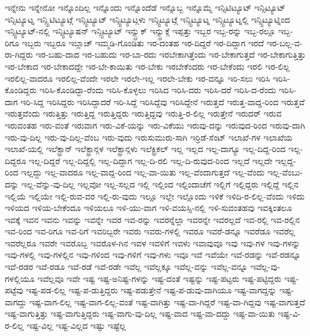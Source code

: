 {ಇನ್ನೇನು
ಇನ್ನೇನೋ
ಇನ್ನೊಂದಿಲ್ಲ
ಇನ್ನೊಂದು
ಇನ್ನೊಂದೆಡೆ
ಇನ್ನೊಬ್ಬ
ಇನ್ನೊಮ್ಮೆ
ಇನ್ಸಿಟಿಟ್ಯೂಟ್
ಇನ್ಸಿಟ್ಯೂಟ್
ಇನ್ಸಿಟ್ಯೂಟ್ನ
ಇನ್ಸ್ಟಿಟಿಟ್ಯೂಟ್ಗೆ
ಇನ್ಸ್ಟಿಟ್ಯೂಟ್
ಇನ್ಸ್ಟಿಟ್ಯೂಟ್ಗಳು
ಇನ್ಸ್ಟಿಟ್ಯೂಟ್ಗೆ
ಇನ್ಸ್ಟಿಟ್ಯೂಟ್ನ
ಇನ್ಸ್ಟಿಟ್ಯೂಟ್ನಲ್ಲಿ
ಇನ್ಸ್ಟಿಟ್ಯೂಟ್ನಿಂದ
ಇನ್ಸ್ಟಿಟ್ಯೂಟ್-ನಲ್ಲಿ
ಇನ್ಸ್ಟಿಟ್ಯೂಷನ್
ಇನ್ಸ್ಟಿಟ್ಯೂಟ್
ಇನ್ಸ್ಬ್ರುಕ್
ಇನ್ಸ್ಬ್ರುಕ್ಗೆ
ಇಪ್ಪತ್ತು
ಇಬ್ಬರ
ಇಬ್ಬ-ರನ್ನು
ಇಬ್ಬ-ರಲ್ಲೂ
ಇಬ್ಬ-ರಿಗೂ
ಇಬ್ಬರು
ಇಬ್ಬರೂ
ಇಬ್ಲಾಚ್
ಇಮ್ಮಡಿ-ಗೊಂಡಿತು
ಇರ-ದಂತಹ
ಇರ-ದಿದ್ದರೆ
ಇರ-ದಿದ್ದಾಗ
ಇರದೆ
ಇರ-ಬಲ್ಲ-ವ-ರಾ-ಗಿದ್ದರು
ಇರ-ಬಹು-ದಾದ
ಇರ-ಬಹುದು
ಇರ-ಬಾ-ರದು
ಇರಬೇಕಾಗಿತ್ತೆಂದು
ಇರ-ಬೇಕಾಗುತ್ತದೆ
ಇರ-ಬೇಕಾಗುತ್ತಿತ್ತು
ಇರ-ಬೇಕಾದ
ಇರ-ಬೇಕಾದದ್ದೇ
ಇರ-ಬೇ-ಕಾಯಿತು
ಇರ-ಬೇಕು
ಇರಬೇಕೆಂದರು
ಇರ-ಬೇಕೆಂದು
ಇರಲಿ
ಇರ-ಲಿಲ್ಲ
ಇರಲಿಲ್ಲ-ವಾದರೂ
ಇರಲಿಲ್ಲ-ವೆಂದೇ
ಇರಲೇ
ಇರಲೇ-ಇಲ್ಲ
ಇರಲೇ-ಬೇಕು
ಇರ-ವನ್ನೂ
ಇರಿ-ಸಲು
ಇರಿಸಿ
ಇರಿಸಿ-ಕೊಂಡಿದ್ದರು
ಇರಿಸಿ-ಕೊಂಡಿದ್ದಾ-ರೆಂದು
ಇರಿಸಿ-ಕೊಳ್ಳಲು
ಇರಿಸಿದ
ಇರಿಸಿ-ದರು
ಇರಿಸಿ-ದರೆ
ಇರಿಸಿ-ದ-ರೆಂದು
ಇರಿಸಿ-ದಾಗ
ಇರಿ-ಸಿದ್ದ
ಇರಿಸಿದ್ದರು
ಇರಿಸಿದ್ದಾದರೆ
ಇರಿ-ಸಿದ್ದೆ
ಇರಿಸಿದ್ದೆವು
ಇರಿಸಿದ್ದೇನೆ
ಇರುತ್ತದೆ
ಇರುತ್ತ-ವಾದ್ದ-ರಿಂದ
ಇರುತ್ತವೆ
ಇರುತ್ತವೆಂದು
ಇರುತ್ತಿತ್ತು
ಇರುತ್ತಿದ್ದ
ಇರುತ್ತಿದ್ದರು
ಇರುತ್ತಿದ್ದವು
ಇರುತ್ತಿ-ರ-ಲಿಲ್ಲ
ಇರುತ್ತೇನೆ
ಇರುದರ್
ಇರುವ
ಇರುವಂತಹ
ಇರು-ವಂತೆ
ಇರುವಾಗ
ಇರು-ವಿಕೆ-ಯನ್ನು
ಇರು-ವಿಕೆಯು
ಇರುವು-ದನ್ನು
ಇರುವುದ-ರಿಂದ
ಇರುವು-ದಾಗಿ
ಇರು-ವು-ದಿಲ್ಲ
ಇರು-ವು-ದಿಲ್ಲ-ವೆಂಬ
ಇರು-ವುದು
ಇರುಸುಮುರು-ಸಾಗಿ
ಇರ್ರಿಡೆ-ಸೆಂಟ್
ಇಲಾಖೆ-ಗಳ
ಇಲಾಖೆಯ
ಇಲಾಖೆ-ಯಲ್ಲಿ
ಇಲೆಕ್ಟ್ರಾನ್
ಇಲೆಕ್ಟ್ರಾನ್ಗಳ
ಇಲೆಕ್ಟ್ರಾನ್ಗಳು
ಇಲೆಕ್ಟ್ರಿಕಲ್
ಇಲ್ಲ
ಇಲ್ಲದ
ಇಲ್ಲ-ದಾಗ್ಯೂ
ಇಲ್ಲ-ದಿದ್ದ-ರಿಂದ
ಇಲ್ಲ-ದಿದ್ದರೂ
ಇಲ್ಲ-ದಿದ್ದರೆ
ಇಲ್ಲ-ದಿದ್ದಲ್ಲಿ
ಇಲ್ಲ-ದಿದ್ದಾಗ
ಇಲ್ಲ-ದಿ-ರಲಿ
ಇಲ್ಲ-ದಿ-ರುವುದ-ರಿಂದ
ಇಲ್ಲದೆ
ಇಲ್ಲದೇ
ಇಲ್ಲದ್ದ-ರಿಂದ
ಇಲ್ಲದ್ದು
ಇಲ್ಲ-ವಾದರೂ
ಇಲ್ಲ-ವಾದ್ದ-ರಿಂದ
ಇಲ್ಲ-ವಾ-ಯಿತು
ಇಲ್ಲ-ವೆಂದಾಗುತ್ತದೆ
ಇಲ್ಲ-ವೆಂದು
ಇಲ್ಲ-ವೆಂಬು-ದನ್ನು
ಇಲ್ಲ-ವೆನ್ನು-ವು-ದಿಲ್ಲ
ಇಲ್ಲವೋ
ಇಲ್ಲ-ಸಲ್ಲದ
ಇಲ್ಲಿ
ಇಲ್ಲಿಂದ
ಇಲ್ಲಿಂದಾಚೆಗೆ
ಇಲ್ಲಿಗೆ
ಇಲ್ಲಿದ್ದರು
ಇಲ್ಲಿದ್ದೆ
ಇಲ್ಲಿನ
ಇಲ್ಲಿಯೆ
ಇಲ್ಲಿಯೇ
ಇಲ್ಲಿ-ರುವ-ವರ
ಇಲ್ಲಿ-ರು-ವುದು
ಇಲ್ಲೂ
ಇಲ್ಲೇ
ಇಲ್ಲೊಂದು
ಇಳಿಕೆ
ಇಳಿದಿ-ರ-ಲಿಲ್ಲ-ವೆಂದು
ಇಳಿದು
ಇಳಿಯದ
ಇಳಿಯ-ಬೇಕೆಂದೂ
ಇಳಿಯಲೂ
ಇಳಿ-ಯು-ವಾಗ
ಇಳಿ-ವಯಸ್ಸಿ-ನಲ್ಲಿ
ಇಳಿ-ಸುವಂತಹವು
ಇವಕ್ಕಿಂತಲೂ
ಇವಕ್ಕೆ
ಇವನ
ಇವನು
ಇವನ್ನು
ಇವನ್ನೇ
ಇವರ
ಇವ-ರನ್ನು
ಇವರನ್ನೆಲ್ಲಾ
ಇವರನ್ನೇ
ಇವರಲ್ಲದೆ
ಇವ-ರಲ್ಲಿ
ಇವ-ರಲ್ಲಿನ
ಇವ-ರಿಂದ
ಇವ-ರಿಗೂ
ಇವ-ರಿಗೆ
ಇವರಿಬ್ಬರೇ
ಇವರು
ಇವರು-ಗಳಲ್ಲಿ
ಇವರೂ
ಇವರೆ-ಡನ್ನೂ
ಇವರೆಡೂ
ಇವರೆಲ್ಲ
ಇವರೆಲ್ಲರೂ
ಇವರೇ
ಇವರೊಬ್ಬ
ಇವರೊಳ-ಗಿನ
ಇವಳ
ಇವಳಿಗೆ
ಇವಳು
ಇವಾವುವೂ
ಇವು
ಇವು-ಗಳ
ಇವು-ಗಳನ್ನು
ಇವು-ಗಳಲ್ಲಿ
ಇವು-ಗಳಲ್ಲಿನ
ಇವು-ಗಳಿಂದ
ಇವು-ಗಳಿಗೆ
ಇವು-ಗಳು
ಇವೂ
ಇವೆ
ಇವೆಯೇ
ಇವೆ-ರಡನ್ನು
ಇವೆ-ರಡನ್ನೂ
ಇವೆ-ರಡರ
ಇವೆ-ರಡೂ
ಇವೆ-ರಡೆ
ಇವೆ-ರಡೇ
ಇವೆಲ್ಲ
ಇವೆಲ್ಲಕ್ಕೂ
ಇವೆಲ್ಲ-ವನ್ನು
ಇವೆಲ್ಲ-ವನ್ನೂ
ಇವೆಲ್ಲ-ವು-ಗಳಲ್ಲಿಯೂ
ಇವೆಲ್ಲವೂ
ಇವೇ
ಇಷ್ಟ
ಇಷ್ಟ-ಅನಿಷ್ಟ-ಗಳನ್ನು
ಇಷ್ಟ-ದಂತೆ
ಇಷ್ಟನ್ನು
ಇಷ್ಟ-ಪಟ್ಟರು
ಇಷ್ಟ-ಪಟ್ಟಿದ್ದರು
ಇಷ್ಟ-ಪಟ್ಟೆವು
ಇಷ್ಟ-ಪಡ-ಲಿಲ್ಲ
ಇಷ್ಟ-ಪ-ಡುತ್ತಿದ್ದರು
ಇಷ್ಟ-ಪಡುತ್ತೇನೆ
ಇಷ್ಟ-ಪ-ಡುವು-ದಾಗಿಯೂ
ಇಷ್ಟ-ವಾಗದ್ದನ್ನು
ಇಷ್ಟ-ವಾಗದ್ದು
ಇಷ್ಟ-ವಾಗ-ಲಿಲ್ಲ
ಇಷ್ಟ-ವಾಗ-ಲಿಲ್ಲ-ವಂತೆ
ಇಷ್ಟ-ವಾಗಿತ್ತು
ಇಷ್ಟ-ವಾ-ಗಿದ್ದರೆ
ಇಷ್ಟ-ವಾ-ಗಿದ್ದವು
ಇಷ್ಟ-ವಾಗುತ್ತದೆ
ಇಷ್ಟ-ವಾಗುತ್ತಿತ್ತು
ಇಷ್ಟ-ವಾಗುತ್ತಿದ್ದರು
ಇಷ್ಟ-ವಾಗು-ವು-ದಿಲ್ಲ
ಇಷ್ಟ-ವಾದ
ಇಷ್ಟ-ವಾ-ದದ್ದು
ಇಷ್ಟ-ವಾ-ಯಿತು
ಇಷ್ಟ-ವಿ-ರ-ಲಿಲ್ಲ
ಇಷ್ಟ-ವಿಲ್ಲ
ಇಷ್ಟ-ವಿಲ್ಲದ
ಇಷ್ಟು
ಇಷ್ಟೆಲ್ಲ
}
